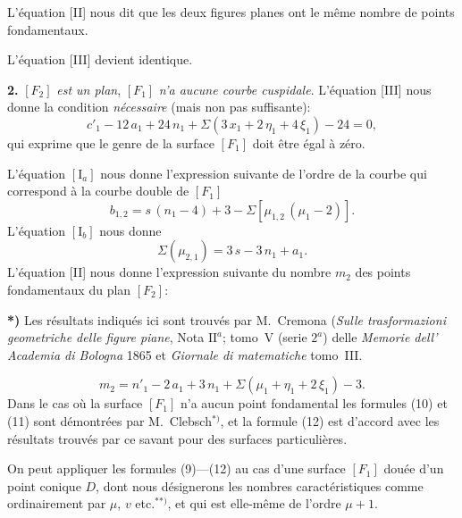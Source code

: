 \documentclass{article}
\begin{document}
L'équation [II] nous dit que les deux figures planes ont le même nombre de points fondamentaux.

L'équation [III] devient identique.

\textbf{2.} $[F_2]$ \emph{est un plan}, $[F_1]$ \emph{n'a aucune courbe cuspidale}. L'équation [III] nous donne la condition \emph{nécessaire} (mais non pas suffisante):
\[
c'_1 - 12\,a_1 + 24\,n_1 + \Sigma(3\,x_1 + 2\,\eta_1 + 4\,\xi_1) - 24 = 0, \tag{9}
\]
qui exprime que le genre de la surface $[F_1]$ doit être égal à zéro.

L'équation $[\mathrm{I}_a]$ nous donne l'expression suivante de l'ordre de la courbe qui correspond à la courbe double de $[F_1]$
\[
b_{1, 2} = s\,(n_1 - 4) + 3 - \Sigma[\mu_{1, 2}\,(\mu_1 - 2)]. \tag{10}
\]
L'équation $[\mathrm{I}_b]$ nous donne
\[
\Sigma(\mu_{2, 1}) = 3\,s - 3\,n_1 + a_1. \tag{11}
\]
L'équation [II] nous donne l'expression suivante du nombre $m_2$ des points fondamentaux du plan $[F_2]$:

\textbf{*)} Les résultats indiqués ici sont trouvés par M.~Cremona (\emph{Sulle trasformazioni geometriche delle figure piane}, Nota $\mathrm{II}^a$; tomo~V (serie $2^a$) delle \emph{Memorie dell' Academia di Bologna} 1865 et \emph{Giornale di matematiche} tomo~III.

\[
m_2 = n'_1 - 2\,a_1 + 3\,n_1 + \Sigma(\mu_1 + \eta_1 + 2\,\xi_1) - 3. \tag{12}
\]
Dans le cas où la surface $[F_1]$ n'a aucun point fondamental les formules (10) et (11) sont démontrées par M.~Clebsch${}^{*)}$, et la formule (12) est d'accord avec les résultats trouvés par ce savant pour des surfaces particulières.

On peut appliquer les formules (9)---(12) au cas d'une surface $[F_1]$ douée d'un point conique $D$, dont nous désignerons les nombres caractéristiques comme ordinairement par $\mu$, $v$ etc.${}^{**)}$, et qui est elle-même de l'ordre $\mu + 1$.
\end{document}
